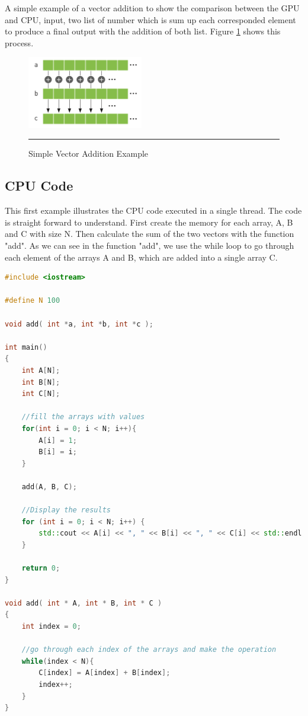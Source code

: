 A simple example of a vector addition to show the comparison between the GPU and CPU, input, two list of number which is sum up each corresponded element to produce a final output with the addition of both list. Figure \ref{fig:sum} shows this process.

\begin{figure}[htbp]
	\centering
		\includegraphics[width=0.45\textwidth]{Figures/sum.png}
		\rule{35em}{0.3pt}
	\caption[Vector Addition Example]{Simple Vector Addition Example}
	\label{fig:sum}
\end{figure}

\subsection{CPU Code}

This first example illustrates the CPU code executed in a single thread. The code is straight forward to understand. First create the memory for each array, A, B and C with size N. Then calculate the sum of the two vectors with the function "add". As we can see in the function "add", we use the while loop to go through each element of the arrays A and B, which are added into a single array C.

\begin{lstlisting}[language=C++, caption={CPU Vector Addition}]
#include <iostream>

#define N 100

void add( int *a, int *b, int *c );

int main()
{
    int A[N];
    int B[N];
    int C[N];
    
    //fill the arrays with values
    for(int i = 0; i < N; i++){
        A[i] = 1;
        B[i] = i;
    }
    
    add(A, B, C);
    
    //Display the results
    for (int i = 0; i < N; i++) {
        std::cout << A[i] << ", " << B[i] << ", " << C[i] << std::endl;
    }
    
    return 0;
}

void add( int * A, int * B, int * C )
{
    int index = 0;
    
    //go through each index of the arrays and make the operation
    while(index < N){
        C[index] = A[index] + B[index];
        index++;
    }
}

\end{lstlisting}

